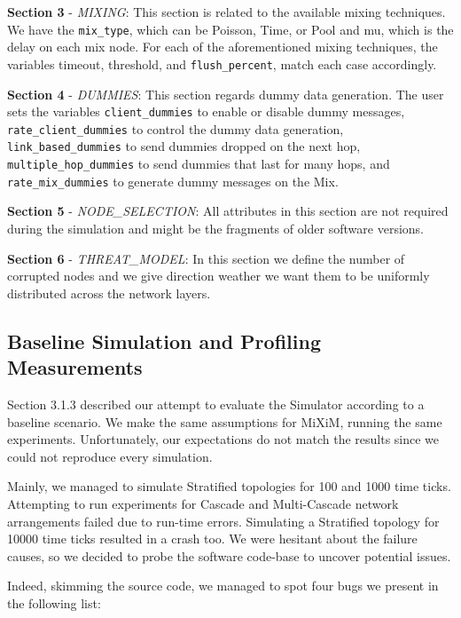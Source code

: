 \documentclass[logo,msc,cyber]{infthesis}   %
\begin{document}
\textbf{Section 3} - \emph{MIXING}: This section is related to the available
mixing techniques. We have the \texttt{mix\_type}, which can be Poisson, Time,
or Pool and mu, which is the delay on each mix node. For each of the
aforementioned mixing techniques, the variables timeout, threshold, and
\texttt{flush\_percent}, match each case accordingly.

\textbf{Section 4} - \emph{DUMMIES}: This section regards dummy data generation.
The user sets the variables \texttt{client\_dummies} to enable or disable dummy
messages, \texttt{rate\_client\_dummies} to control the dummy data generation,
\texttt{link\_based\_dummies} to send dummies dropped on the next hop,
\texttt{multiple\_hop\_dummies} to send dummies that last for many hops, and
\texttt{rate\_mix\_dummies} to generate dummy messages on the Mix.

\textbf{Section 5} - \emph{NODE\_SELECTION}: All attributes in this
section are not required during the simulation and might be the fragments of
older software versions. 

\textbf{Section 6} - \emph{THREAT\_MODEL}: In this section we define the number
of corrupted nodes and we give direction weather we want them to be uniformly
distributed across the network layers.


\subsection{Baseline Simulation and Profiling Measurements}

Section 3.1.3 described our attempt to evaluate the Simulator according to a
baseline scenario. We make the same assumptions for MiXiM, running the same
experiments. Unfortunately, our expectations do not match the results since we
could not reproduce every simulation.

Mainly, we managed to simulate Stratified topologies for 100 and 1000 time
ticks. Attempting to run experiments for Cascade and Multi-Cascade network
arrangements failed due to run-time errors. Simulating a Stratified topology for
10000 time ticks resulted in a crash too. We were hesitant about the failure
causes, so we decided to probe the software code-base to uncover potential
issues.

Indeed, skimming the source code, we managed to spot four bugs we present in the following list: 
\end{document}

